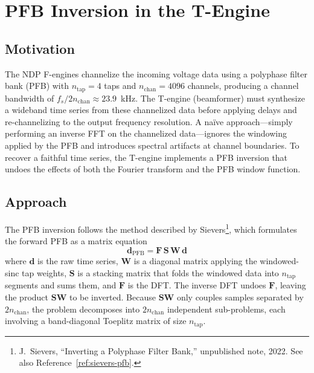 
\chapter{PFB Inversion in the T-Engine}
\label{app:pfbinverse}

\section{Motivation}

The NDP F-engines channelize the incoming voltage data using a polyphase filter bank (PFB) with $n_\mathrm{tap} = 4$ taps and $n_\mathrm{chan} = 4096$ channels, producing a channel bandwidth of $f_s / 2 n_\mathrm{chan} \approx 23.9$~kHz.  The T-engine (beamformer) must synthesize a wideband time series from these channelized data before applying delays and re-channelizing to the output frequency resolution.  A na\"ive approach---simply performing an inverse FFT on the channelized data---ignores the windowing applied by the PFB and introduces spectral artifacts at channel boundaries.  To recover a faithful time series, the T-engine implements a PFB inversion that undoes the effects of both the Fourier transform and the PFB window function.

\section{Approach}

The PFB inversion follows the method described by Sievers\footnote{J.~Sievers, ``Inverting a Polyphase Filter Bank,'' unpublished note, 2022.  See also Reference~\ref{ref:sievers-pfb}.}, which formulates the forward PFB as a matrix equation
\begin{equation}
    \mathbf{d}_\mathrm{PFB} = \mathbf{F} \, \mathbf{S} \, \mathbf{W} \, \mathbf{d}
\end{equation}
where $\mathbf{d}$ is the raw time series, $\mathbf{W}$ is a diagonal matrix applying the windowed-sinc tap weights, $\mathbf{S}$ is a stacking matrix that folds the windowed data into $n_\mathrm{tap}$ segments and sums them, and $\mathbf{F}$ is the DFT.  The inverse DFT undoes $\mathbf{F}$, leaving the product $\mathbf{S}\mathbf{W}$ to be inverted.  Because $\mathbf{S}\mathbf{W}$ only couples samples separated by $2 n_\mathrm{chan}$, the problem decomposes into $2 n_\mathrm{chan}$ independent sub-problems, each involving a band-diagonal Toeplitz matrix of size $n_\mathrm{tap}$.

